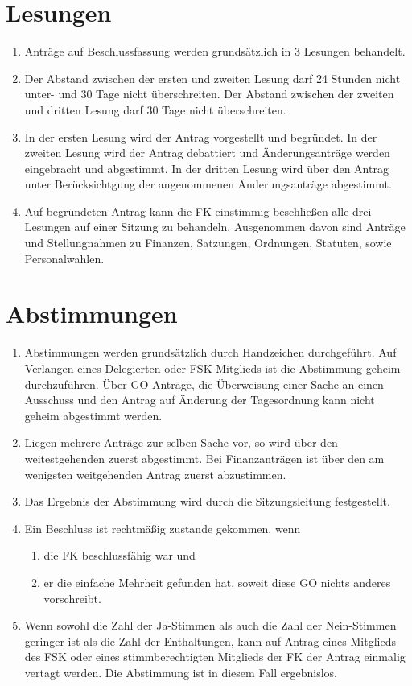 \documentclass{article}
\begin{document}
\section{Lesungen}
\begin{enumerate}[(1)]
    \item Anträge auf Beschlussfassung werden grundsätzlich in 3 Lesungen behandelt.
    \item Der Abstand zwischen der ersten und zweiten Lesung darf 24 Stunden nicht unter- und 30 Tage nicht überschreiten.
    	Der Abstand zwischen der zweiten und dritten Lesung darf 30 Tage nicht überschreiten.
    \item In der ersten Lesung wird der Antrag vorgestellt und begründet.
    	In der zweiten Lesung wird der Antrag debattiert und Änderungsanträge werden eingebracht und abgestimmt.
    	In der dritten Lesung wird über den Antrag unter Berücksichtgung der angenommenen Änderungsanträge abgestimmt.
    \item Auf begründeten Antrag kann die FK einstimmig beschließen alle drei Lesungen auf einer Sitzung zu behandeln. 
    	Ausgenommen davon sind Anträge und Stellungnahmen zu Finanzen, Satzungen, Ordnungen, Statuten, sowie Personalwahlen.
\end{enumerate}

\section{Abstimmungen}
\begin{enumerate}[(1)]
    \item Abstimmungen werden grundsätzlich durch Handzeichen durchgeführt. Auf Verlangen eines Delegierten oder FSK Mitglieds ist die Abstimmung geheim durchzuführen. Über GO-Anträge, die Überweisung einer Sache an einen Ausschuss und den Antrag auf Änderung der Tagesordnung kann nicht geheim abgestimmt werden.
    \item Liegen mehrere Anträge zur selben Sache vor, so wird über den weitestgehenden zuerst abgestimmt. 
    	Bei Finanzanträgen ist über den am wenigsten weitgehenden Antrag zuerst abzustimmen.
    \item Das Ergebnis der Abstimmung wird durch die Sitzungsleitung festgestellt.
    \item Ein Beschluss ist rechtmäßig zustande gekommen, wenn
    \begin{enumerate}[1.]
        \item die FK beschlussfähig war und
        \item er die einfache Mehrheit gefunden hat, soweit diese GO nichts anderes vorschreibt.
    \end{enumerate}
    \item Wenn sowohl die Zahl der Ja-Stimmen als auch die Zahl der Nein-Stimmen geringer ist als die Zahl der Enthaltungen, kann auf Antrag eines Mitglieds des FSK oder eines stimmberechtigten Mitglieds der FK der Antrag einmalig vertagt werden. 
    	Die Abstimmung ist in diesem Fall ergebnislos.
\end{enumerate}
\end{document}
